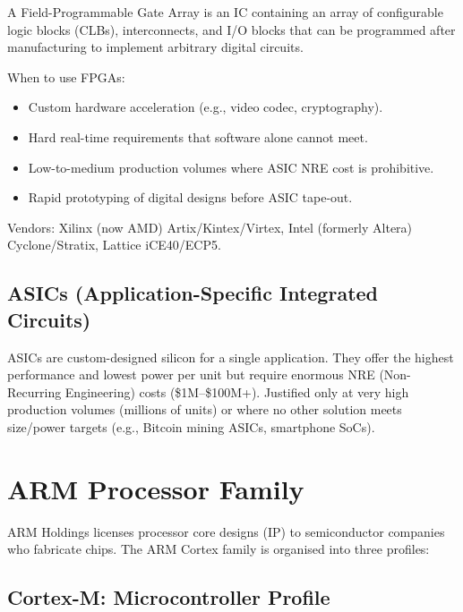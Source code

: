 \begin{definition}[FPGA]
A Field-Programmable Gate Array is an IC containing an array of configurable logic blocks (CLBs), interconnects, and I/O blocks that can be programmed after manufacturing to implement arbitrary digital circuits.
\end{definition}

When to use FPGAs:
\begin{itemize}[nosep]
  \item Custom hardware acceleration (e.g., video codec, cryptography).
  \item Hard real-time requirements that software alone cannot meet.
  \item Low-to-medium production volumes where ASIC NRE cost is prohibitive.
  \item Rapid prototyping of digital designs before ASIC tape-out.
\end{itemize}

Vendors: Xilinx (now AMD) Artix/Kintex/Virtex, Intel (formerly Altera) Cyclone/Stratix, Lattice iCE40/ECP5.

\subsection{ASICs (Application-Specific Integrated Circuits)}

ASICs are custom-designed silicon for a single application. They offer the highest performance and lowest power per unit but require enormous NRE (Non-Recurring Engineering) costs (\$1M--\$100M+). Justified only at very high production volumes (millions of units) or where no other solution meets size/power targets (e.g., Bitcoin mining ASICs, smartphone SoCs).

\section{ARM Processor Family}
\label{sec:proc:arm}

ARM Holdings licenses processor core designs (IP) to semiconductor companies who fabricate chips. The ARM Cortex family is organised into three profiles:

\subsection{Cortex-M: Microcontroller Profile}

